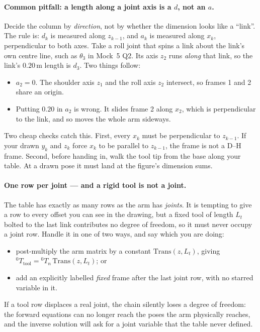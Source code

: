 \documentclass[11pt,a4paper]{article}
\begin{document}
\paragraph{Common pitfall: a length along a joint axis is a $d$, not an $a$.}
Decide the column by \emph{direction}, not by whether the dimension looks like a ``link''. The rule
is: $d_k$ is measured along $z_{k-1}$, and $a_k$ is measured along $x_k$, perpendicular to both
axes. Take a roll joint that spins a link about the link's own centre line, such as $\theta_3$ in
Mock~5 Q2. Its axis $z_2$ runs \emph{along} that link, so the link's $0.20$\,m length is $d_3$.
Two things follow:
\begin{itemize}
\item $a_2=0$. The shoulder axis $z_1$ and the roll axis $z_2$ intersect, so frames 1 and 2 share
      an origin.
\item Putting $0.20$ in $a_2$ is wrong. It slides frame 2 along $x_2$, which is perpendicular to the
      link, and so moves the whole arm sideways.
\end{itemize}
Two cheap checks catch this. First, every $x_k$ must be perpendicular to $z_{k-1}$. If your drawn
$y_k$ and $z_k$ force $x_k$ to be parallel to $z_{k-1}$, the frame is not a D--H frame. Second,
before handing in, walk the tool tip from the base along your table. At a drawn pose it must land at
the figure's dimension sums.

\paragraph{One row per joint --- and a rigid tool is not a joint.}
The table has exactly as many rows as the arm has \emph{joints}. It is tempting to give a row to
every offset you can see in the drawing, but a fixed tool of length $L_t$ bolted to the last link
contributes no degree of freedom, so it must never occupy a joint row. Handle it in one of two ways,
and say which you are doing:
\begin{itemize}
\item post-multiply the arm matrix by a constant $\mathrm{Trans}(z,L_t)$, giving
      ${}^0T_{\text{tool}}={}^0T_n\,\mathrm{Trans}(z,L_t)$; or
\item add an explicitly labelled \emph{fixed} frame after the last joint row, with no starred
      variable in it.
\end{itemize}
If a tool row displaces a real joint, the chain silently loses a degree of freedom: the forward
equations can no longer reach the poses the arm physically reaches, and the inverse solution will
ask for a joint variable that the table never defined.
\end{document}
